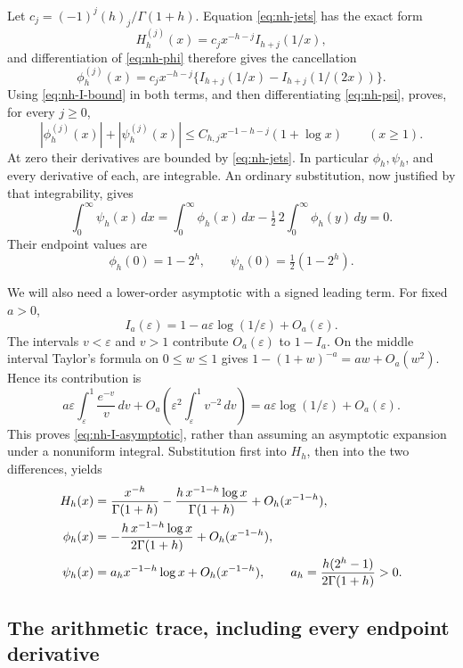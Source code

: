 Let \(c_j=(-1)^j(h)_j/\Gamma(1+h)\). Equation \eqref{eq:nh-jets}
has the exact form
\[
 H_h^{(j)}(x)=c_jx^{-h-j}I_{h+j}(1/x),
\]
and differentiation of \eqref{eq:nh-phi} therefore gives the cancellation
\[
 \phi_h^{(j)}(x)
 =c_jx^{-h-j}\{I_{h+j}(1/x)-I_{h+j}(1/(2x))\}.
\]
Using \eqref{eq:nh-I-bound} in both terms, and then differentiating
\eqref{eq:nh-psi}, proves, for every \(j\ge0\),
\begin{equation}\label{eq:nh-all-tail}
 |\phi_h^{(j)}(x)|+|\psi_h^{(j)}(x)|
 \le C_{h,j}x^{-1-h-j}(1+\log x)\qquad(x\ge1).
\end{equation}
At zero their derivatives are bounded by \eqref{eq:nh-jets}. In particular
\(\phi_h,\psi_h\), and every derivative of each, are integrable.
An ordinary substitution, now justified by that integrability, gives
\begin{equation}\label{eq:nh-mean-zero}
 \int_0^\infty\psi_h(x)\,dx
 =\int_0^\infty\phi_h(x)\,dx
       -\tfrac12\,2\int_0^\infty\phi_h(y)\,dy=0 .
\end{equation}
Their endpoint values are
\[
 \phi_h(0)=1-2^h,\qquad \psi_h(0)=\tfrac12(1-2^h).
\]

We will also need a lower-order asymptotic with a signed leading term.
For fixed \(a>0\),
\begin{equation}\label{eq:nh-I-asymptotic}
 I_a(\varepsilon)=1-a\varepsilon\log(1/\varepsilon)+O_a(\varepsilon).
\end{equation}
The intervals \(v<\varepsilon\) and \(v>1\) contribute \(O_a(\varepsilon)\)
to \(1-I_a\). On the middle interval Taylor's formula on \(0\le w\le1\)
gives
\(1-(1+w)^{-a}=aw+O_a(w^2)\). Hence its contribution is
\[
 a\varepsilon\int_\varepsilon^1\frac{e^{-v}}v\,dv
       +O_a\left(\varepsilon^2\int_\varepsilon^1v^{-2}\,dv\right)
 =a\varepsilon\log(1/\varepsilon)+O_a(\varepsilon).
\]
This proves \eqref{eq:nh-I-asymptotic}, rather than assuming an asymptotic
expansion under a nonuniform integral. Substitution first into \(H_h\),
then into the two differences, yields
\begin{align}
 H_h(x)&=\frac{x^{-h}}{\Gamma(1+h)}
       -\frac{h\,x^{-1-h}\log x}{\Gamma(1+h)}
       +O_h(x^{-1-h}),\notag\\
 \phi_h(x)&=-\frac{h\,x^{-1-h}\log x}{2\Gamma(1+h)}
       +O_h(x^{-1-h}),\notag\\
 \psi_h(x)&=a_hx^{-1-h}\log x+O_h(x^{-1-h}),\qquad
 a_h=\frac{h(2^h-1)}{2\Gamma(1+h)}>0 .
 \label{eq:nh-signed-tail}
\end{align}

\subsection{The arithmetic trace, including every endpoint derivative}


